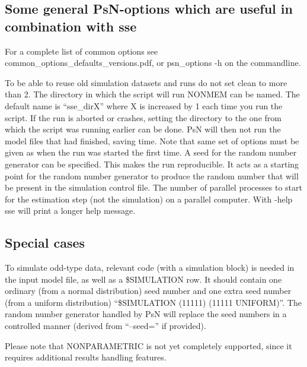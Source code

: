\subsection{Some general PsN-options which are useful in combination with sse }
For a complete list of common options see common\_options\_defaults\_versions.pdf, or psn\_options -h on the commandline. 

\begin{optionlist}
To be able to reuse old simulation datasets and runs do not set clean to more than 2. 
\nextopt
{}
The directory in which the script will run NONMEM can be named. The default name is “sse\_dirX” where X is increased by 1 each time you run the script. If the run is aborted or crashes, setting the directory to the one from which the script was running earlier can be done. PsN will then not run the model files that had finished, saving time. Note that same set of options must be given as when the run was started the first time. 
\nextopt
{}
A seed for the random number generator can be specified. This makes the run reproducible. It acts as a starting point for the random number generator to produce the random number that will be present in the simulation control file. 
\nextopt
{}
The number of parallel processes to start for the estimation step (not the simulation) on a parallel computer. 
\nextopt
{}
With -help sse will print a longer help message. 
\nextopt
\end{optionlist}


\subsection{Special cases}
To simulate odd-type data, relevant code (with a simulation block) is needed in the input model file, as well as a \$SIMULATION row. It should contain one ordinary (from a normal distribution) seed number and one extra seed number (from a uniform distribution) “\$SIMULATION (11111) (11111 UNIFORM)”. The random number generator handled by PsN will replace the seed numbers in a controlled manner (derived from “–seed=” if provided).

Please note that NONPARAMETRIC is not yet completely supported, since it requires additional results handling features.

